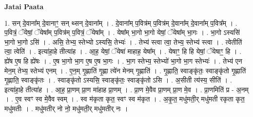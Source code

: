 \documentclass[17pt]{extarticle}
\begin{document}
\textbf{Jatai Paata} \newline

1. सन् दे॒वाना᳚म् दे॒वानाꣳ॒॒ सन् थ्सन् दे॒वाना᳚म् । . दे॒वाना᳚म् प॒वित्र॑म् प॒वित्र॑म् दे॒वाना᳚म् दे॒वाना᳚म् प॒वित्र᳚म् । . प॒वित्रं॒ ॅयेषां॒ ॅयेषा᳚म् प॒वित्र॑म् प॒वित्रं॒ ॅयेषा᳚म् । . येषा᳚म् भा॒गो भा॒गो येषां॒ ॅयेषा᳚म् भा॒गः । . भा॒गो ऽस्यसि॑ भा॒गो भा॒गो ऽसि॑ । . असि॒ तेभ्य॒ स्तेभ्यो ऽस्यसि॒ तेभ्यः॑ । . तेभ्य॑ स्त्वा त्वा॒ तेभ्य॒ स्तेभ्य॑ स्त्वा । . त्वेतीति॑ त्वा॒ त्वेति॑ । . इत्या॑हा॒हे तीत्या॑ह । . आ॒ह॒ येषां॒ ॅयेषा॑ माहाह॒ येषा᳚म् । . येषाꣳ॒॒ हि हि येषां॒ ॅयेषाꣳ॒॒ हि । . ह्ये॑ष ए॒ष हि ह्ये॑षः । . ए॒ष भा॒गो भा॒ग ए॒ष ए॒ष भा॒गः । . भा॒ग स्तेभ्य॒ स्तेभ्यो॑ भा॒गो भा॒ग स्तेभ्यः॑ । . तेभ्य॑ एन मेन॒म् तेभ्य॒ स्तेभ्य॑ एनम् । . ए॒न॒म् गृ॒ह्णाति॑ गृ॒ह्णा त्ये॑न मेनम् गृ॒ह्णाति॑ । . गृ॒ह्णाति॒ स्वाङ्कृ॑तः॒ स्वाङ्कृ॑तो गृ॒ह्णाति॑ गृ॒ह्णाति॒ स्वाङ्कृ॑तः । . स्वाङ्कृ॑तो ऽस्यसि॒ स्वाङ्कृ॑तः॒ स्वाङ्कृ॑तो ऽसि । . अ॒सीती त्य॑स्य॒ सीति॑ । . इत्या॑हा॒हे तीत्या॑ह । . आ॒ह॒ प्रा॒णम् प्रा॒ण मा॑हाह प्रा॒णम् । . प्रा॒ण मे॒वैव प्रा॒णम् प्रा॒ण मे॒व । . प्रा॒णमिति॑ प्र - अ॒नम् । . ए॒व स्वꣳ स्व मे॒वैव स्वम् । . स्व म॑कृता कृत॒ स्वꣳ स्व म॑कृत । . अ॒कृ॒त॒ मधु॑मती॒र् मधु॑मती रकृता कृत॒ मधु॑मतीः । . मधु॑मतीर् नो नो॒ मधु॑मती॒र् मधु॑मतीर् नः । \newline
\end{document}
